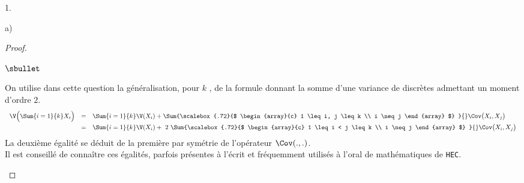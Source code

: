 \documentclass[11pt]{article}%
\begin{document}
\begin{noliste}{1.}
\begin{noliste}{a)}
\begin{proof}
\begin{remarkL}{.98}
\begin{noliste}{$\sbullet$}
        \item On utilise dans cette question la généralisation, pour
          $k$ \var, de la formule donnant la somme d'une variance de
          \var discrètes admettant un moment d'ordre $2$.
          \[
          \begin{array}{rcl}
            \V \Big(\Sum{i=1}{k} X_i \Big) & = & \Sum{i=1}{k} \V(X_i) +
            \Sum{%
              \scalebox{.72}{$
                \begin{array}{c}
                  1 \leq i, j \leq k \\
                  i \neq j
                \end{array}
                $}
            }{} \Cov\big(X_i, X_j \big)
            \\[.2cm]
            & = & \Sum{i=1}{k} \V(X_i) + \ 2 \ 
            \Sum{%
              \scalebox{.72}{$
                \begin{array}{c}
                  1 \leq i < j \leq k \\
                  i \neq j
                \end{array}
                $}
            }{} \Cov\big(X_i, X_j \big)
          \end{array}
          \]
          La deuxième égalité se déduit de la première par symétrie de
          l'opérateur $\Cov(., .)$.\\
          Il est conseillé de connaître ces égalités, parfois
          présentes à l'écrit et fréquemment utilisés à l'oral de
          mathématiques de {\tt HEC}.

\end{noliste}
\end{remarkL}
\end{proof}
\end{noliste}
\end{noliste}
\end{document}
